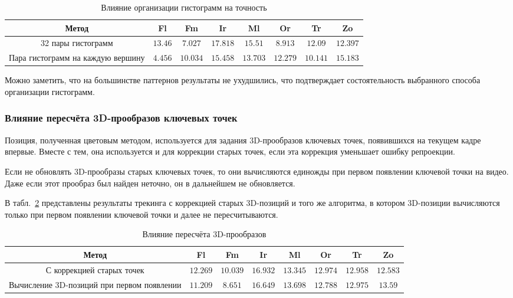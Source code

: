
\begin{table}[h]
\caption{\label{tab:full_hist}Влияние организации гистограмм на точность}
\begin{center}
\begin{tabular}{|c|c|c|c|c|c|c|c|}
\hline
Метод & Fl & Fm & Ir & Ml & Or & Tr & Zo \\
\hline
32 пары гистограмм & $13.46$ & $7.027$ & $17.818$ & $15.51$ & $8.913$ & $12.09$
& $12.397$ \\
\hline
Пара гистограмм на каждую вершину & $4.456$ & $10.034$ & $15.458$ & $13.703$ &
$12.279$ & $10.141$ & $15.183$ \\
\hline
\end{tabular}
\end{center}
\end{table}

Можно заметить, что на большинстве паттернов результаты не ухудшились, что
подтверждает состоятельность выбранного способа организации гистограмм.

\subsubsection{Влияние пересчёта 3D-прообразов ключевых точек}

Позиция, полученная цветовым методом, используется для задания 3D-прообразов
ключевых точек, появившихся на текущем кадре впервые.
Вместе с тем, она используется и для коррекции старых точек, если эта коррекция
уменьшает ошибку репроекции.

Если не обновлять 3D-прообразы старых ключевых точек, то они вычисляются
единожды при первом появлении ключевой точки на видео.
Даже если этот прообраз был найден неточно, он в дальнейшем не обновляется.

В табл.~\ref{tab:reprojection} представлены результаты трекинга с коррекцией
старых 3D-позиций и того же алгоритма, в котором 3D-позиции вычисляются
только при первом появлении ключевой точки и далее не пересчитываются.

\begin{table}[h]
\caption{\label{tab:reprojection}Влияние пересчёта 3D-прообразов}
\begin{center}
\begin{tabular}{|c|c|c|c|c|c|c|c|}
\hline
Метод & Fl & Fm & Ir & Ml & Or & Tr & Zo \\
\hline
С коррекцией старых точек & $12.269$ & $10.039$ & $16.932$ & $13.345$ &
$12.974$ &
$12.958$ & $12.583$ \\
\hline
Вычисление 3D-позиций при первом появлении & $11.209$ & $8.651$ & $16.649$ &
$13.698$ & $12.788$ & $12.975$ &
$13.59$ \\
\hline
\end{tabular}
\end{center}
\end{table}

